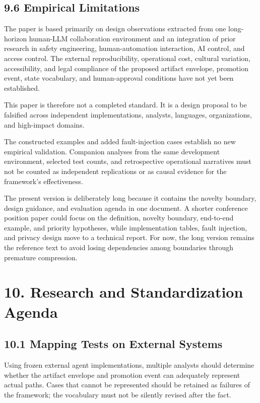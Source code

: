 \subsection{9.6 Empirical Limitations}\label{empirical-limitations}

The paper is based primarily on design observations extracted from one long-horizon human-LLM collaboration environment and an integration of prior research in safety engineering, human-automation interaction, AI control, and access control. The external reproducibility, operational cost, cultural variation, accessibility, and legal compliance of the proposed artifact envelope, promotion event, state vocabulary, and human-approval conditions have not yet been established.

This paper is therefore not a completed standard. It is a design proposal to be falsified across independent implementations, analysts, languages, organizations, and high-impact domains.

The constructed examples and added fault-injection cases establish no new empirical validation. Companion analyses from the same development environment, selected test counts, and retrospective operational narratives must not be counted as independent replications or as causal evidence for the framework's effectiveness.

The present version is deliberately long because it contains the novelty boundary, design guidance, and evaluation agenda in one document. A shorter conference position paper could focus on the definition, novelty boundary, end-to-end example, and priority hypotheses, while implementation tables, fault injection, and privacy design move to a technical report. For now, the long version remains the reference text to avoid losing dependencies among boundaries through premature compression.

\section{10. Research and Standardization Agenda}\label{research-and-standardization-agenda}

\subsection{10.1 Mapping Tests on External Systems}\label{mapping-tests-on-external-systems}

Using frozen external agent implementations, multiple analysts should determine whether the artifact envelope and promotion event can adequately represent actual paths. Cases that cannot be represented should be retained as failures of the framework; the vocabulary must not be silently revised after the fact.

